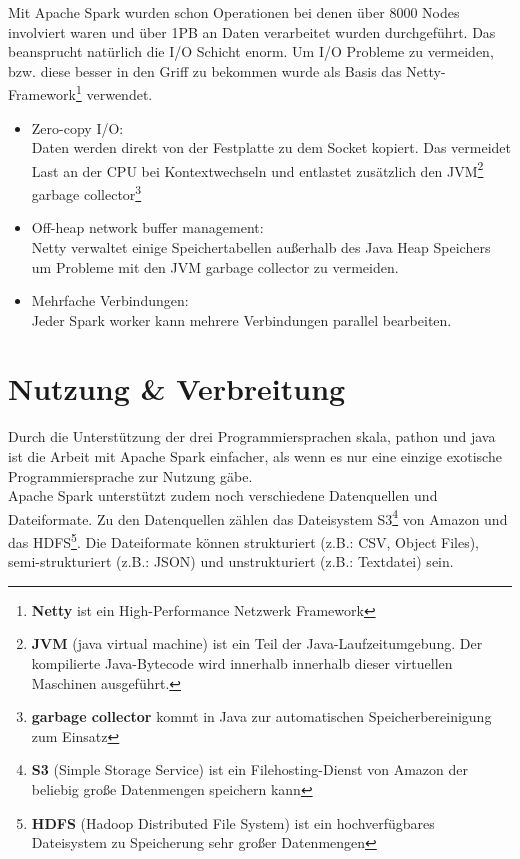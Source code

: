 Mit Apache Spark wurden schon Operationen bei denen über 8000 Nodes involviert waren und über 1PB an Daten verarbeitet wurden durchgeführt.
Das beansprucht natürlich die I/O Schicht enorm.
Um I/O Probleme zu vermeiden, bzw. diese besser in den Griff zu bekommen wurde als Basis das Netty-Framework\footnote{\textbf{Netty} ist ein High-Performance Netzwerk Framework} verwendet.
\begin{itemize}
	\item Zero-copy I/O:\\
	Daten werden direkt von der Festplatte zu dem Socket kopiert. Das vermeidet Last an der CPU bei Kontextwechseln und entlastet zusätzlich den JVM\footnote{\textbf{JVM} (java virtual machine) ist ein Teil der Java-Laufzeitumgebung. Der kompilierte Java-Bytecode wird innerhalb innerhalb dieser virtuellen Maschinen ausgeführt.} garbage collector\footnote{\textbf{garbage collector} kommt in Java zur automatischen Speicherbereinigung zum Einsatz}
	\item Off-heap network buffer management:\\
	Netty verwaltet einige Speichertabellen außerhalb des Java Heap Speichers um Probleme mit den JVM garbage collector zu vermeiden.
	\item Mehrfache Verbindungen:\\
	Jeder Spark worker kann mehrere Verbindungen parallel bearbeiten.
\end{itemize}


\section{Nutzung \& Verbreitung}

Durch die Unterstützung der drei Programmiersprachen skala, pathon und java ist die Arbeit mit Apache Spark einfacher, als wenn es nur eine einzige exotische Programmiersprache zur Nutzung gäbe. \\

\noindent
Apache Spark unterstützt zudem noch verschiedene Datenquellen und Dateiformate.  Zu den Datenquellen zählen das Dateisystem S3\footnote{\textbf{S3} (Simple Storage Service) ist ein Filehosting-Dienst von Amazon der beliebig große Datenmengen speichern kann} von Amazon und das HDFS\footnote{\textbf{HDFS} (Hadoop Distributed File System) ist ein hochverfügbares Dateisystem zu Speicherung sehr großer Datenmengen}.
Die Dateiformate können strukturiert (z.B.: CSV, Object Files), semi-strukturiert (z.B.: JSON) und unstrukturiert (z.B.: Textdatei) sein.\\

